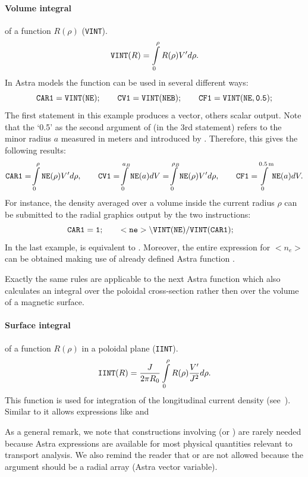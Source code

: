 \paragraph{Volume integral} of a function $R(\rho)$ ({\tt VINT}).
$$
{\tt VINT}(R)=\int\limits_0^{\rho} R(\rho)V'd\rho
.$$
In Astra models the function  can be used in several different
ways: 
$$
{\tt 
CAR1=VINT(NE);    \qquad
CV1=VINT(NEB);    \qquad
CF1=VINT(NE,0.5);
}
$$
The first statement in this example produces a vector, others
scalar output.
Note that the `0.5' as the second argument of  (in the 3rd 
statement) refers to the minor radius $a$ measured in meters and 
introduced by .
Therefore, this gives the following results:
$$
{\tt CAR1}=\!\int\limits_0^{\rho}{\tt NE}(\rho)V'd\rho
,\qquad
{\tt CV1}=\!\int\limits_0^{a_B}{\tt NE}(a)dV
=\!\int\limits_0^{\rho_B}{\tt NE}(\rho)V'd\rho
,\qquad
{\tt CF1}=\!\!\int\limits_0^{0.5\,\rm m}\!{\tt NE}(a)dV
.$$
For instance, the density averaged over a volume inside the current
radius $\rho$ can be submitted to the radial graphics output by the two
instructions: 
$$
\tw{CAR1=1;
\qquad
<ne>\symbol{92}VINT(NE)/VINT(CAR1);~~~
}
$$
In the last example,  is equivalent to .
Moreover, the entire expression for $<n_e>$ can be obtained making use
of already defined Astra function .

Exactly the same rules are applicable to the next Astra function
 which also calculates an integral over the poloidal
cross-section rather then over the volume of a magnetic surface.

\paragraph{Surface integral} of a function $R(\rho)$ in a poloidal plane
({\tt IINT}). 
$$
{\tt IINT}(R)
=\frac{J}{2\pi R_0}\int\limits_0^{\rho} R(\rho)\frac{V'}{J^2}d\rho
.$$
This function is used for integration of the longitudinal
current density (see~). 
Similar to  it allows expressions like 
 and 

As a general remark, we note that constructions involving  (or
) are rarely needed because Astra expressions are
available for most physical quantities relevant to transport analysis.
We also remind the reader that  or  are
not allowed because the argument should be a radial array (Astra vector
variable). 

